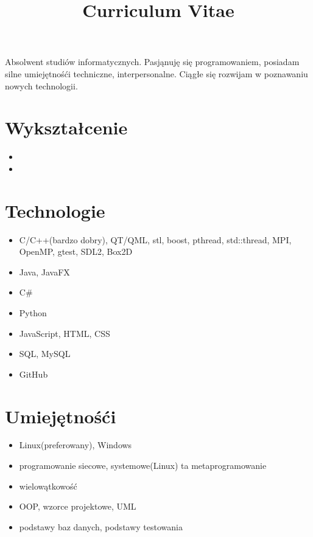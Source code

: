 \documentclass[12pt,a4paper,sans]{moderncv}
\title{Curriculum Vitae}
\begin{document}
\makecvtitle
\small{Absolwent studiów informatycznych. Pasjąnuję się programowaniem, posiadam silne umiejętnośći techniczne, interpersonalne. Ciągłe się rozwijam w poznawaniu nowych technologii.}

\section{Wykształcenie}

\begin{itemize}
\item{}
\item{}

\end{itemize}

\section{Technologie}
\begin{itemize}

\item{C/C++(bardzo dobry), QT/QML, stl, boost, pthread, std::thread, MPI, OpenMP, gtest, SDL2, Box2D}
\item{Java, JavaFX}
\item{C\#}
\item{Python}
\item{JavaScript, HTML, CSS}
\item{SQL, MySQL}
\item{GitHub}
\end{itemize}

\section{Umiejętnośći}
\begin{itemize}
\item{Linux(preferowany), Windows}
\item{programowanie siecowe, systemowe(Linux) ta metaprogramowanie}
\item{wielowątkowość}
\item{OOP, wzorce projektowe, UML}
\item{podstawy baz danych, podstawy testowania}
\end{itemize}
\end{document}
